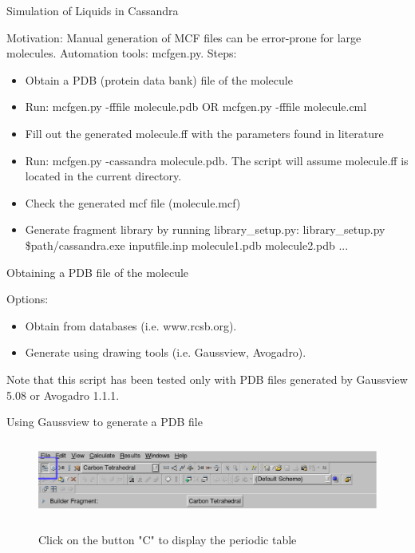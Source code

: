 \documentclass{beamer}
\begin{document}





\begin{frame}{Simulation of Liquids in Cassandra}

Motivation: Manual generation of MCF files can be error-prone for large molecules.
Automation tools: mcfgen.py.
Steps:
\begin{itemize}
	\item Obtain a PDB (protein data bank) file of the molecule
	\item Run: mcfgen.py -fffile molecule.pdb OR mcfgen.py -fffile molecule.cml
	\item Fill out the generated molecule.ff with the parameters found in literature
	\item Run: mcfgen.py -cassandra molecule.pdb. The script will assume molecule.ff
		is located in the current directory. 
	\item Check the generated mcf file (molecule.mcf)
	\item Generate fragment library by running library\_setup.py: library\_setup.py \$path/cassandra.exe inputfile.inp molecule1.pdb molecule2.pdb ...
\end{itemize}

\end{frame}
\begin{frame}{Obtaining a PDB file of the molecule}

Options:
\begin{itemize}
\item Obtain from databases (i.e. www.rcsb.org). 
\item Generate using drawing tools (i.e. Gaussview, Avogadro). 
\end{itemize}

Note that this script has been tested only with PDB files generated
by Gaussview 5.08 or Avogadro 1.1.1.

\end{frame}
\begin{frame}{Using Gaussview to generate a PDB file}
\begin{figure}
\begin{center}
\includegraphics[height=1in]{gaussian1final.eps}
\end{center}
Click on the button "C" to display the periodic table
\end{figure}
\end{frame}
\end{document}
